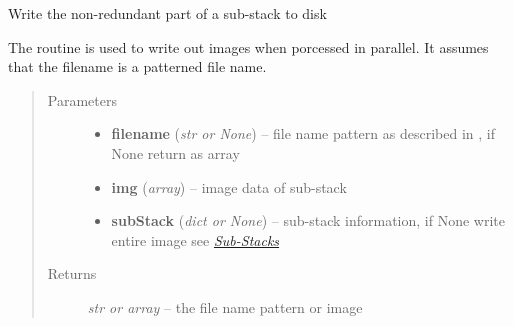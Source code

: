 \documentclass[letterpaper,10pt,english]{sphinxmanual}
\begin{document}

\begin{fulllineitems}
\label{api/ClearMap.ImageProcessing:ClearMap.ImageProcessing.StackProcessing.writeSubStack}
Write the non-redundant part of a sub-stack to disk

The routine is used to write out images when porcessed in parallel.
It assumes that the filename is a patterned file name.
\begin{quote}\begin{description}
\item[{Parameters}] \leavevmode\begin{itemize}
\item {} 
\textbf{filename} (\emph{str or None}) --
file name pattern as described in
, if None return as array

\item {} 
\textbf{img} (\emph{array}) --
image data of sub-stack

\item {} 
\textbf{subStack} (\emph{dict or None}) --
sub-stack information, if None write entire image
see {\hyperref[api/ClearMap.ImageProcessing:substack]{\emph{Sub-Stacks}}}

\end{itemize}

\item[{Returns}] \leavevmode
\emph{str or array} --
the file name pattern or image

\end{description}\end{quote}

\end{fulllineitems}

\end{document}
